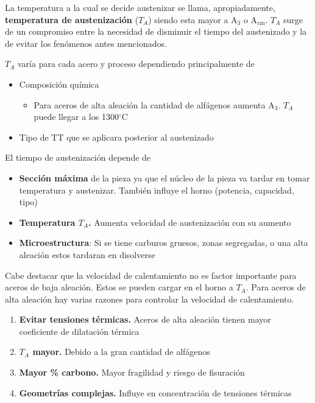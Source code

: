 \documentclass{article}
\newcommand{\Athree}{A\ensuremath{_{3}}}
\newcommand{\Acm}{A\ensuremath{_{\mathrm{cm}}}}
\newcommand{\grad}{\ensuremath{^\circ \mathrm{C}}}
\begin{document}
La temperatura a la cual se decide austenizar se llama, apropiadamente, \textbf{temperatura de austenización} ($T_A$) siendo esta mayor a \Athree{} o \Acm{}. $T_A$ surge de un compromiso entre la necesidad de disminuir el tiempo del austenizado y la de evitar los fenómenos antes mencionados. 

$T_A$ varía para cada acero y proceso dependiendo principalmente de
\begin{itemize}
    \item Composición química
    \begin{itemize}
    	\item Para aceros de alta aleaci\'on la cantidad de alf\'agenos aumenta \Athree. $T_A$ puede llegar a los 1300\grad~
    \end{itemize}
    \item Tipo de TT que se aplicara posterior al austenizado
\end{itemize}

El tiempo de austenización depende de
\begin{itemize}
    \item \textbf{Sección máxima} de la pieza ya que el núcleo de la pieza va tardar en tomar temperatura y austenizar. También influye el horno (potencia, capacidad, tipo)
    \item \textbf{Temperatura $T_A$.} Aumenta velocidad de austenización con su aumento
    \item \textbf{Microestructura}: Si se tiene carburos gruesos, zonas segregadas, o una alta aleación estos tardaran en disolverse
\end{itemize}

Cabe destacar que la velocidad de calentamiento no es factor importante para aceros de baja aleación. Estos se pueden cargar en el horno a $T_A$. Para aceros de alta aleación hay varias razones para controlar la velocidad de calentamiento.
\begin{enumerate}
    \item \textbf{Evitar tensiones térmicas.} Aceros de alta aleación tienen mayor coeficiente de dilatación térmica
    \item \textbf{$T_A$ mayor.} Debido a la gran cantidad de alfágenos
    \item \textbf{Mayor \% carbono.} Mayor fragilidad y riesgo de fisuración
    \item \textbf{Geometrías complejas.} Influye en concentración de tensiones térmicas
\end{enumerate}
\end{document}
